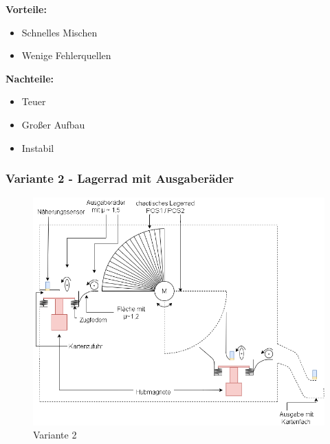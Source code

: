 \textbf{Vorteile:}
\begin{itemize}
    \item Schnelles Mischen
    \item Wenige Fehlerquellen
\end{itemize}
\textbf{Nachteile:}
\begin{itemize}
    \item Teuer
    \item Großer Aufbau %
    \item Instabil
\end{itemize}

\subsubsection{Variante 2 - Lagerrad mit Ausgaberäder}

\begin{figure}[H]
    \centering
    \includegraphics[scale=0.6,page=1]{fig/mech/V1904-Page-2.png}
    \caption{Variante 2}
\end{figure}


